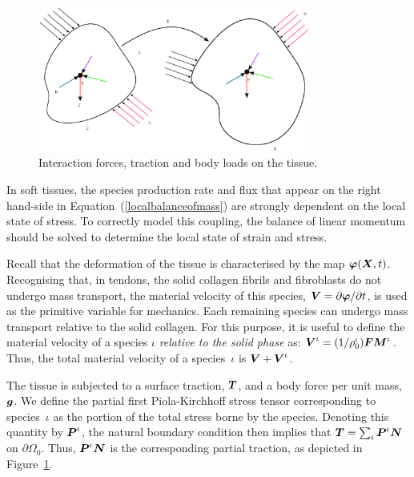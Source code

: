 \begin{figure}[ht]
  \centering
  \includegraphics[width=0.8\textwidth]{images/elucidation/continuum-potato-momentum}
  \caption{Interaction forces, traction and body loads on the tissue.}
  \label{continuum-potato-momentum}
\end{figure}

In soft tissues, the species production rate and flux that appear on
the right hand-side in Equation~(\ref{localbalanceofmass}) are
strongly dependent on the local state of stress. To correctly model
this coupling, the balance of linear momentum should be solved to
determine the local state of strain and stress.

Recall that the deformation of the tissue is characterised by the map
$\mbox{\boldmath$\varphi$}(\mbox{\boldmath$ X$},t)$. Recognising that, in tendons, the solid collagen
fibrils and fibroblasts do not undergo mass transport, the material
velocity of this species, $\mbox{\boldmath$ V$} = \partial\mbox{\boldmath$\varphi$}/\partial t$, is used
as the primitive variable for mechanics. Each remaining species can
undergo mass transport relative to the solid collagen. For this
purpose, it is useful to define the material velocity of a species
$\iota$ \emph{relative to the solid phase} as: $\mbox{\boldmath$ V$}^\iota =
(1/\rho_0^\iota)\mbox{\boldmath$ F$}\mbox{\boldmath$ M$}^\iota$. Thus, the total material velocity of a
species~$\iota$ is $\mbox{\boldmath$ V$}+\mbox{\boldmath$ V$}^\iota$.

The tissue is subjected to a surface traction, $\mbox{\boldmath$ T$}$, and a body force
per unit mass, $\mbox{\boldmath$ g$}$. We define the partial first Piola-Kirchhoff
stress tensor corresponding to species~$\iota$ as the portion of the
total stress borne by the species. Denoting this quantity by
$\mbox{\boldmath$ P$}^\iota$, the natural boundary condition then implies that $\mbox{\boldmath$ T$} =
\sum_{\iota}\mbox{\boldmath$ P$}^\iota\mbox{\boldmath$ N$}$ on $\partial\Omega_0$. Thus, $\mbox{\boldmath$ P$}^\iota\mbox{\boldmath$ N$}$
is the corresponding partial traction, as depicted in
Figure~\ref{continuum-potato-momentum}.

